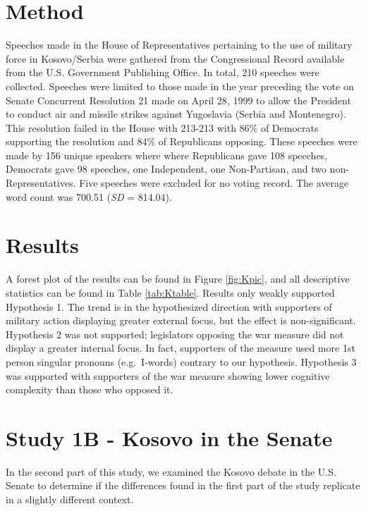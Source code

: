 \documentclass[english,,man,floatsintext]{apa6}
\begin{document}
\hypertarget{method-1}{%
\section{Method}\label{method-1}}

Speeches made in the House of Representatives pertaining to the use of military force in Kosovo/Serbia were gathered from the Congressional Record available from the U.S. Government Publishing Office. In total, 210 speeches were collected. Speeches were limited to those made in the year preceding the vote on Senate Concurrent Resolution 21 made on April 28, 1999 to allow the President to conduct air and missile strikes against Yugoslavia (Serbia and Montenegro). This resolution failed in the House with 213-213 with 86\% of Democrats supporting the resolution and 84\% of Republicans opposing. These speeches were made by 156 unique speakers where where Republicans gave 108 speeches, Democrats gave 98 speeches, one Independent, one Non-Partisan, and two non-Representatives. Five speeches were excluded for no voting record. The average word count was 700.51 (\emph{SD} = 814.04).

\hypertarget{results}{%
\section{Results}\label{results}}

A forest plot of the results can be found in Figure \ref{fig:Kpic}, and all descriptive statistics can be found in Table \ref{tab:Ktable}. Results only weakly supported Hypothesis 1. The trend is in the hypothesized direction with supporters of military action displaying greater external focus, but the effect is non-significant. Hypothesis 2 was not supported; legislators opposing the war measure did not display a greater internal focus. In fact, supporters of the measure used more 1st person singular pronouns (e.g.~I-words) contrary to our hypothesis. Hypothesis 3 was supported with supporters of the war measure showing lower cognitive complexity than those who opposed it.

\hypertarget{study-1b---kosovo-in-the-senate}{%
\section{Study 1B - Kosovo in the Senate}\label{study-1b---kosovo-in-the-senate}}

In the second part of this study, we examined the Kosovo debate in the U.S. Senate to determine if the differences found in the first part of the study replicate in a slightly different context.
\end{document}
